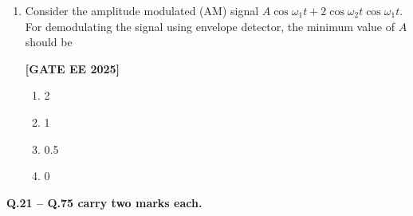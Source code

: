 \documentclass[12pt]{article}
\begin{document}
\begin{enumerate}[leftmargin=2.5em, label=\textbf{Q.\arabic*}., itemsep=2em]
\item Consider the amplitude modulated (AM) signal $A\cos\omega_1 t+2\cos\omega_2 t\cos\omega_1 t$. For demodulating the signal using envelope detector, the minimum value of $A$ should be
 
\noindent \textbf{[GATE EE 2025]}
\begin{enumerate}[label=(\Alph*)]
  \item 2
  \item 1
  \item 0.5
  \item 0
\end{enumerate}

\end{enumerate}

\vspace{1em}
\large \textbf {Q.21 – Q.75 carry two marks each.}
\vspace{1em}
\end{document}
